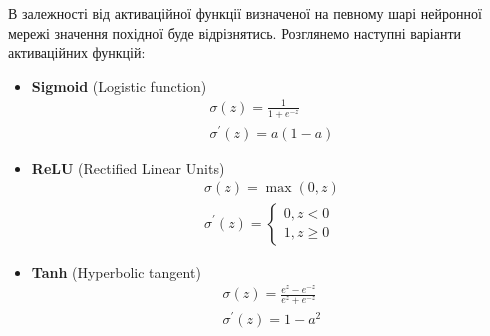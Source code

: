 \documentclass[14pt,a4paper]{extarticle}
\newcounter{e}
\numberwithin{equation}{section}
\numberwithin{figure}{section}
\begin{document}
	В залежності від активаційної функції визначеної на певному шарі нейронної мережі значення похідної буде відрізнятись. Розглянемо наступні варіанти активаційних функцій:
	\begin{itemize}	
		\item \textbf{Sigmoid} (Logistic function)
		\label{eq:sigmoid}
		\begin{equation}
			\begin{array}{l}
				\displaystyle
				\sigma(z)=\frac{1}{1+e^{-z}} \\[0.5cm]

				\displaystyle
				\sigma^{\prime}(z)=a(1-a)
			\end{array}
		\end{equation}
		
		\item \textbf{ReLU} (Rectiﬁed Linear Units)
		\begin{equation}
			\label{eq:relu}
			\begin{array}{l}
				\displaystyle
				\sigma(z)=\max (0, z) \\[0.5cm]

				\displaystyle
				\sigma^{\prime}(z)=\left\{\begin{array}{l}
					0, z<0 \\
					1, z \geq 0
				\end{array}\right.
			\end{array}
		\end{equation}
		
		\item \textbf{Tanh} (Hyperbolic tangent)
		\begin{equation}
			\label{eq:tanh}
			\begin{array}{l}
				\displaystyle
				\sigma(z)=\frac{e^{z}-e^{-z}}{e^{z}+e^{-z}} \\[0.5cm]

				\displaystyle
				\sigma^{\prime}(z)=1-a^{2}
			\end{array}
		\end{equation}
	\end{itemize}
	
\end{document}

